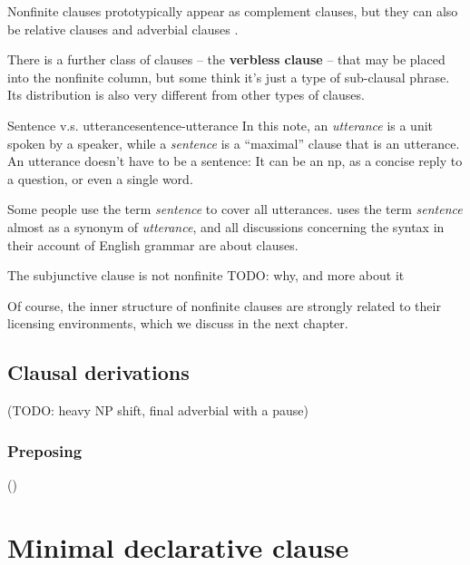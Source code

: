 \documentclass[UTF8, a4paper, oneside, scheme=plain]{ctexrep}
\newcommand*{\citepage}[1]{p.~{#1}}
\newcommand*{\concept}[1]{\textbf{#1}}
\newcommand*{\term}[1]{\emph{#1}}
\begin{document}
Nonfinite clauses prototypically appear as complement clauses, 
but they can also be relative clauses and adverbial clauses \citep[\citepage{1264}]{cgel}.

There is a further class of clauses -- the \concept{verbless clause} \citep[\citepage{1266}]{cgel} -- 
that may be placed into the nonfinite column,
but some think it's just a type of sub-clausal phrase.
Its distribution is also very different from other types of clauses.

\begin{infobox}{Sentence v.s. utterance}{sentence-utterance}
    In this note, an \term{utterance} is a unit spoken by a speaker,
    while a \term{sentence} is a ``maximal'' clause that is an utterance.
    An utterance doesn't have to be a sentence:
    It can be an \acs{np}, as a concise reply to a question,
    or even a single word.

    Some people use the term \term{sentence} to cover all utterances.
    \citet[\citepage{45}, \citepage{853}]{cgel} uses the term \term{sentence} 
    almost as a synonym of \term{utterance},
    and all discussions concerning the syntax in their account of English grammar are about clauses.
\end{infobox}

The subjunctive clause is not nonfinite \citep[\citepage{83}]{cgel} TODO: why, and more about it 

Of course, the inner structure of nonfinite clauses are strongly related to their licensing environments,
which we discuss in the next chapter.

\subsection{Clausal derivations}\label{sec:simple-clause.derivation}

(TODO: heavy NP shift, final adverbial with a pause)

\subsubsection{Preposing}\label{sec:simple-clause.derivation.preposing}

()

\section{Minimal declarative clause}
\end{document}
